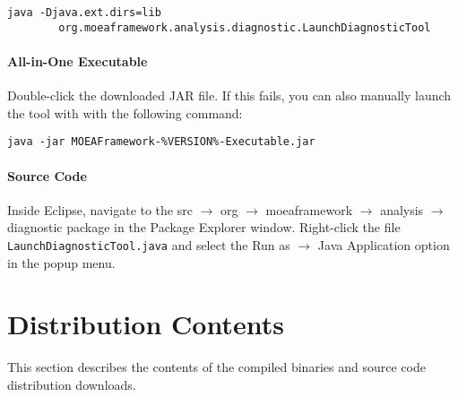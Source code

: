 \begin{lstlisting}[language=Plaintext]
java -Djava.ext.dirs=lib
		org.moeaframework.analysis.diagnostic.LaunchDiagnosticTool
\end{lstlisting}

\paragraph{All-in-One Executable}
Double-click the downloaded JAR file.  If this fails, you can also manually launch the tool with with the following command:

\begin{lstlisting}[language=Plaintext]
java -jar MOEAFramework-%VERSION%-Executable.jar
\end{lstlisting}

\paragraph{Source Code}
Inside Eclipse, navigate to the src $\rightarrow$ org $\rightarrow$ moeaframework $\rightarrow$ analysis $\rightarrow$ diagnostic package in the Package Explorer window.  Right-click the file \texttt{LaunchDiagnosticTool.java} and select the Run as $\rightarrow$ Java Application option in the popup menu.

\section{Distribution Contents}
This section describes the contents of the compiled binaries and source code distribution downloads.

